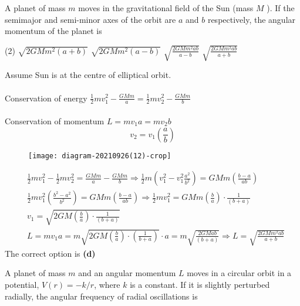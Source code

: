 \begin{enumerate}
\begin{answer}
\end{answer}
\begin{minipage}{\textwidth}
	\item A planet of mass $m$ moves in the gravitational field of the Sun (mass $M$ ). If the semimajor and semi-minor axes of the orbit are $a$ and $b$ respectively, the angular momentum of the planet is
\end{minipage}
\begin{tasks}(2)
	\task[\textbf{A.}]$\sqrt{2 G M m^{2}(a+b)}$
	\task[\textbf{B.}]$\sqrt{2 G M m^{2}(a-b)}$
	\task[\textbf{C.}]$\sqrt{\frac{2 G M m^{2} a b}{a-b}}$
	\task[\textbf{D.}]$\sqrt{\frac{2 G M m^{2} a b}{a+b}}$
\end{tasks}
\begin{answer}
	 Assume Sun is at the centre of elliptical orbit.\\\\
	Conservation of energy $\frac{1}{2} m v_{1}^{2}-\frac{G M m}{a}=\frac{1}{2} m v_{2}^{2}-\frac{G M m}{b}$\\\\
	Conservation of momentum $L=m v_{1} a=m v_{2} b$
	$$
	v_{2}=v_{1}\left(\frac{a}{b}\right)
	$$
	\begin{figure}[H]
		\centering
		\texttt{[image: diagram-20210926(12)-crop]}
	\end{figure}
	\begin{align*}
		&\frac{1}{2} m v_{1}^{2}-\frac{1}{2} m v_{2}^{2}=\frac{G M m}{a}-\frac{G M m}{b} \Rightarrow \frac{1}{2} m\left(v_{1}^{2}-v_{1}^{2} \frac{a^{2}}{b^{2}}\right)=G M m\left(\frac{b-a}{a b}\right) \\
		&\frac{1}{2} m v_{1}^{2}\left(\frac{b^{2}-a^{2}}{b^{2}}\right)=G M m\left(\frac{b-a}{a b}\right) \Rightarrow \frac{1}{2} m v_{1}^{2}=G M m\left(\frac{b}{a}\right) \cdot \frac{1}{(b+a)} \\
		&v_{1}=\sqrt{2 G M\left(\frac{b}{a}\right) \cdot \frac{1}{(b+a)}} \\
		&L=m v_{1} a=m \sqrt{2 G M\left(\frac{b}{a}\right) \cdot\left(\frac{1}{b+a}\right)} \cdot a=m \sqrt{\frac{2 G M a b}{(b+a)}} \Rightarrow L=\sqrt{\frac{2 G M m^{2} a b}{a+b}}
	\end{align*}
	The correct option is \textbf{(d)}
\end{answer}
\begin{minipage}{\textwidth}
	\item A planet of mass $m$ and an angular momentum $L$ moves in a circular orbit in a potential, $V(r)=-k / r$, where $k$ is a constant. If it is slightly perturbed radially, the angular frequency of radial oscillations is

\end{minipage}
\end{enumerate}
